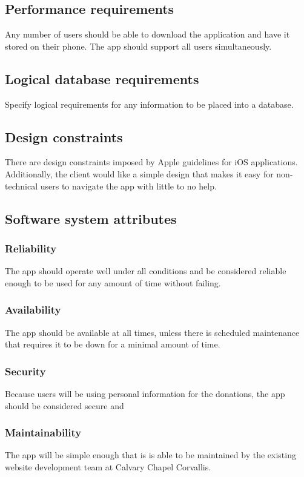 \documentclass[letterpaper,10pt,draftclsnofoot,onecolumn,compsoc,titlepage]{IEEEtran}
\begin{document}
	\subsection{Performance requirements}
	Any number of users should be able to download the application and have it stored on their phone.
	The app should support all users simultaneously.

	\subsection{Logical database requirements}
	Specify logical requirements for any information to be placed into a database.

	\subsection{Design constraints}
	There are design constraints imposed by Apple guidelines for iOS applications.
	Additionally, the client would like a simple design that makes it easy for non-technical users to navigate the app with little to no help.

	\subsection{Software system attributes}
	\subsubsection{Reliability} The app should operate well under all conditions and be considered reliable enough to be used for any amount of time without failing.
	\subsubsection{Availability} The app should be available at all times, unless there is scheduled maintenance that requires it to be down for a minimal amount of time.
	\subsubsection{Security} Because users will be using personal information for the donations, the app should be considered secure and
	\subsubsection{Maintainability} The app will be simple enough that is is able to be maintained by the existing website development team at Calvary Chapel Corvallis.
\end{document}
